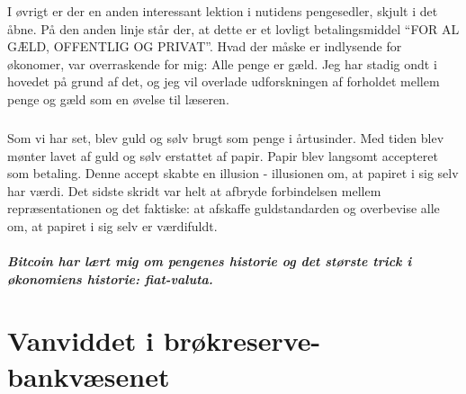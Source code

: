 \documentclass[paper=6in:9in,pagesize=pdftex,
               headinclude=on,footinclude=on,12pt]{scrbook}
\begin{document}
I øvrigt er der en anden interessant lektion i nutidens pengesedler, skjult i det åbne. På den anden linje står der, at dette er et lovligt betalingsmiddel \enquote{FOR AL GÆLD, OFFENTLIG OG PRIVAT}. Hvad der måske er indlysende for økonomer, var overraskende for mig: Alle penge er gæld. Jeg har stadig ondt i hovedet på grund af det, og jeg vil overlade udforskningen af forholdet mellem penge og gæld som en øvelse til læseren.\paragraph{} Som vi har set, blev guld og sølv brugt som penge i årtusinder. Med tiden blev mønter lavet af guld og sølv erstattet af papir. Papir blev langsomt accepteret som betaling. Denne accept skabte en illusion - illusionen om, at papiret i sig selv har værdi. Det sidste skridt var helt at afbryde forbindelsen mellem repræsentationen og det faktiske: at afskaffe guldstandarden og overbevise alle om, at papiret i sig selv er værdifuldt.\paragraph{Bitcoin har lært mig om pengenes historie og det største trick i økonomiens historie: fiat-valuta.}%
%
%
%
%

\chapter{Vanviddet i brøkreserve-bankvæsenet}
\label{les:13}
\end{document}
